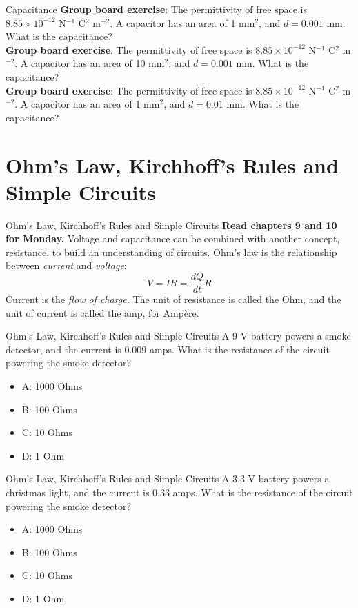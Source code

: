 \documentclass{beamer}
\begin{document}
\begin{frame}{Capacitance}
\textbf{Group board exercise}: The permittivity of free space is $8.85 \times 10^{-12}$ N$^{-1}$ C$^2$ m$^{-2}$.  A capacitor has an area of 1 mm$^2$, and $d = 0.001$ mm.  What is the capacitance? \\ 
\textbf{Group board exercise}: The permittivity of free space is $8.85 \times 10^{-12}$ N$^{-1}$ C$^2$ m$^{-2}$.  A capacitor has an area of 10 mm$^2$, and $d = 0.001$ mm.  What is the capacitance? \\
\textbf{Group board exercise}: The permittivity of free space is $8.85 \times 10^{-12}$ N$^{-1}$ C$^2$ m$^{-2}$.  A capacitor has an area of 1 mm$^2$, and $d = 0.01$ mm.  What is the capacitance?
\end{frame}

\section{Ohm's Law, Kirchhoff's Rules and Simple Circuits}

\begin{frame}{Ohm's Law, Kirchhoff's Rules and Simple Circuits}
\textbf{Read chapters 9 and 10 for Monday.}
Voltage and capacitance can be combined with another concept, \alert{resistance}, to build an understanding of \alert{circuits}.  Ohm's law is the relationship between \textit{current} and \textit{voltage}:
\begin{equation}
V = I R = \frac{dQ}{dt}R
\end{equation}
Current is the \textit{flow of charge.}  The unit of resistance is called the Ohm, and the unit of current is called the amp, for Amp\`{e}re.
\end{frame}

\begin{frame}{Ohm's Law, Kirchhoff's Rules and Simple Circuits}
A 9 V battery powers a smoke detector, and the current is 0.009 amps.  What is the resistance of the circuit powering the smoke detector?
\begin{itemize}
\item A: 1000 Ohms
\item B: 100 Ohms
\item C: 10 Ohms
\item D: 1 Ohm
\end{itemize}
\end{frame}

\begin{frame}{Ohm's Law, Kirchhoff's Rules and Simple Circuits}
A 3.3 V battery powers a christmas light, and the current is 0.33 amps.  What is the resistance of the circuit powering the smoke detector?
\begin{itemize}
\item A: 1000 Ohms
\item B: 100 Ohms
\item C: 10 Ohms
\item D: 1 Ohm
\end{itemize}
\end{frame}
\end{document}
